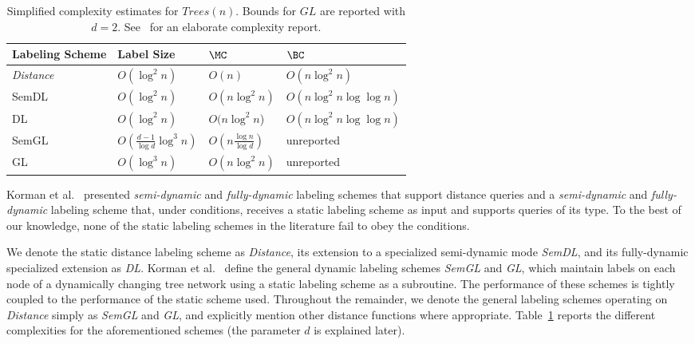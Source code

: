 \begin {table}
	\begin{center}
	    \begin{tabular}{ | l | l | l | l |}
		    \hline
		    Labeling Scheme & Label Size & $\MC$ & $\BC$ \\ \hline
		    \emph{Distance} 	&$O(\log^2 n)$ & $O(n)$ & $O(n \log^2 n)$ \\ \hline
		   SemDL	&$O(\log^2 n)$ & $O(n \log^2 n)$ & $O(n \log^2 n \log \log n)$  \\ \hline
		    DL 		&$O(\log^2 n)$ & $O(n \log^2 n$) & $O(n \log^2 n \log \log n)$ \\ \hline
		   SemGL	&$O(\frac{d-1}{\log d}\log^3 n)$ & $O(n \frac{\log n}{\log d})$ & unreported   \\ \hline
		    GL		& $O(\log^3 n)$ & $O(n \log^2 n)$ & unreported \\
		    \hline
	    \end{tabular}
	 \end{center}
	 	\caption{Simplified complexity estimates for $Trees(n)$. Bounds for $GL$  are reported with $d=2$. See~\cite{korman2004labeling} for an elaborate complexity report.}
	\label{table:complexities}
\end{table}
				
Korman et al.~\cite{korman2004labeling} presented \emph{semi-dynamic} and  \emph{fully-dynamic}  labeling schemes that support distance queries and  a \emph{semi-dynamic} and \emph{fully-dynamic}  labeling scheme that, under conditions, receives a static labeling scheme as input and supports queries of its type. To the best of our knowledge, none of the static labeling schemes in the literature fail to obey the conditions.

 We denote the static distance labeling scheme as  \emph{Distance}, its extension to a specialized  semi-dynamic mode  \emph{SemDL}, and its fully-dynamic  specialized extension as \emph{DL}. 
Korman et al.~\cite{korman2004labeling} define the general dynamic labeling schemes \emph{SemGL} and \emph{GL}, which maintain labels on each node of a dynamically changing tree network using a static labeling scheme as a subroutine. The performance of these schemes is tightly coupled to the performance of the static scheme used.
 Throughout the remainder, we denote the general labeling schemes operating on \emph{Distance} simply as \emph{SemGL} and \emph{GL}, and explicitly mention other distance functions where appropriate.  
 Table~\ref{table:complexities}  reports the  different  complexities  for the aforementioned schemes (the parameter $d$ is explained later).



